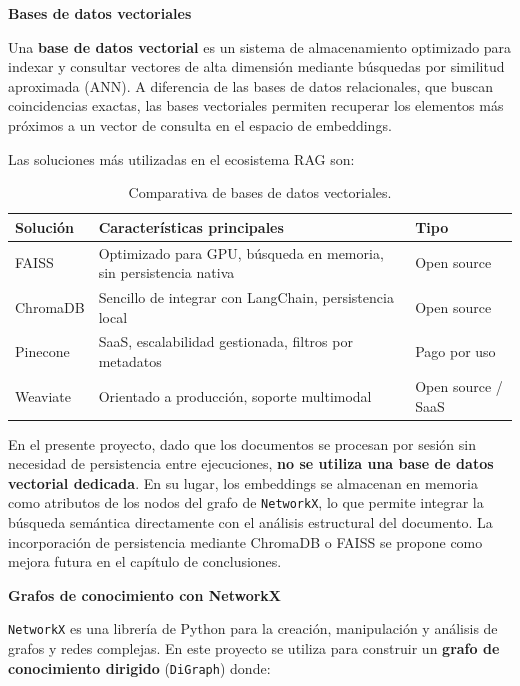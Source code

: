\textbf{Bases de datos vectoriales}

Una \textbf{base de datos vectorial} es un sistema de almacenamiento optimizado para indexar y consultar vectores de alta dimensión mediante búsquedas por similitud aproximada (ANN). A diferencia de las bases de datos relacionales, que buscan coincidencias exactas, las bases vectoriales permiten recuperar los elementos más próximos a un vector de consulta en el espacio de embeddings.

Las soluciones más utilizadas en el ecosistema RAG son:

\begin{table}[H]
\centering
\renewcommand{\arraystretch}{1.4}
\caption{Comparativa de bases de datos vectoriales.}
\label{tab:vectordb_intro}
\begin{tabularx}{\textwidth}{|l|X|l|}
\hline
\textbf{Solución} & \textbf{Características principales} & \textbf{Tipo} \\
\hline
FAISS & Optimizado para GPU, búsqueda en memoria, sin persistencia nativa & Open source \\
\hline
ChromaDB & Sencillo de integrar con LangChain, persistencia local & Open source \\
\hline
Pinecone & SaaS, escalabilidad gestionada, filtros por metadatos & Pago por uso \\
\hline
Weaviate & Orientado a producción, soporte multimodal & Open source / SaaS \\
\hline
\end{tabularx}
\end{table}

En el presente proyecto, dado que los documentos se procesan por sesión sin necesidad de persistencia entre ejecuciones, \textbf{no se utiliza una base de datos vectorial dedicada}. En su lugar, los embeddings se almacenan en memoria como atributos de los nodos del grafo de \texttt{NetworkX}, lo que permite integrar la búsqueda semántica directamente con el análisis estructural del documento. La incorporación de persistencia mediante ChromaDB o FAISS se propone como mejora futura en el capítulo de conclusiones.

\vspace{0.3cm}
\textbf{Grafos de conocimiento con NetworkX}

\texttt{NetworkX} es una librería de Python para la creación, manipulación y análisis de grafos y redes complejas. En este proyecto se utiliza para construir un \textbf{grafo de conocimiento dirigido} (\texttt{DiGraph}) donde:

